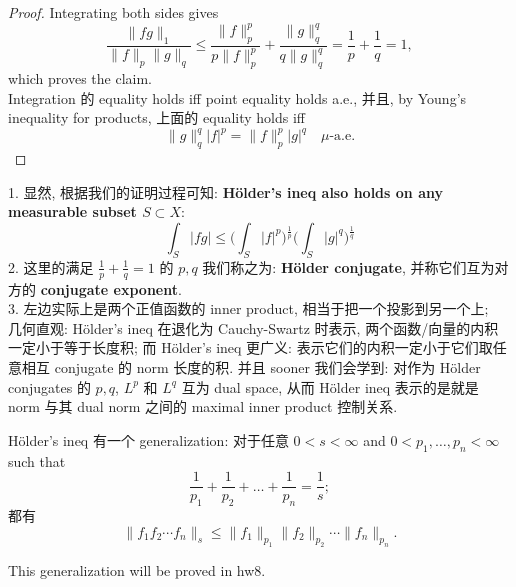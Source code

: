 \documentclass[lang=cn,11pt]{elegantbook}
\begin{document}
\begin{proof}
Integrating both sides gives
\begin{equation}
    \frac{\|fg\|_1}{\|f\|_p \|g\|_q} \leq \frac{\|f\|_p^p}{p \|f\|_p^p} + \frac{\|g\|_q^q}{q \|g\|_q^q} = \frac{1}{p} + \frac{1}{q} = 1,
\end{equation}
which proves the claim.\\
Integration 的 equality holds iff point equality holds a.e., 并且, by Young's inequality for products, 上面的 equality holds iff \[   \|g\|_q^q |f|^p = \|f\|_p^p |g|^q \quad \mu\text{-a.e.}\]
\end{proof}
\begin{remark}
1. 显然, 根据我们的证明过程可知: \textbf{Hölder's ineq also holds on any measurable subset $S \subset X$}: \[
\int_S |fg| \leq  \bigg(\int_S |f|^p \bigg)^{\frac{1}{p}}\bigg(\int_S |g|^q \bigg)^{\frac{1}{q}}
\]
2. 这里的满足 $\frac{1}{p} + \frac{1}{q} = 1$ 的 $p,q$ 我们称之为: \textbf{Hölder conjugate}, 并称它们互为对方的 \textbf{conjugate exponent}.\\
3. 左边实际上是两个正值函数的 inner product, 相当于把一个投影到另一个上;  \\
几何直观: Hölder's ineq 在退化为 Cauchy-Swartz 时表示, 两个函数/向量的内积一定小于等于长度积; 而 Hölder's ineq 更广义: 表示它们的内积一定小于它们取任意相互 conjugate 的 norm 长度的积.
并且 sooner 我们会学到: 对作为 Hölder conjugates 的 $p,q$, $L^p$ 和 $L^q$ 互为 dual space, 从而 Hölder ineq 表示的是就是 norm 与其 dual norm 之间的 maximal inner product 控制关系.
\end{remark}


\begin{remark}
    Hölder's ineq 有一个 generalization:
    对于任意 $0<s<\infty$ and $0<p_1,\dots, p_n< \infty$ such that 
\[
  \frac1{p_1}+\frac1{p_2}+\dots+\frac1{p_n}=\frac1{s};
\]
都有
\[
  \| f_1f_2\cdots f_n\|_s\le \|f_1\|_{p_1}\|f_2\|_{p_2}\cdots \|f_n\|_{p_n}.
\]

    This generalization will be proved in hw8.
\end{remark}
\end{document}
